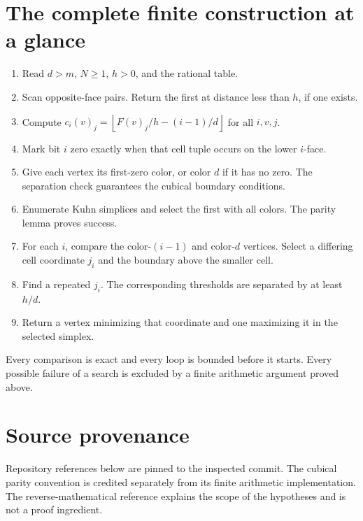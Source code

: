 \documentclass[11pt,a4paper]{article}
\theoremstyle{definition}
\newcommand{\floor}[1]{\left\lfloor #1\right\rfloor}
\begin{document}
\section{The complete finite construction at a glance}
\begin{enumerate}
\item Read $d>m$, $N\geq1$, $h>0$, and the rational table.
\item Scan opposite-face pairs. Return the first at
distance less than $h$, if one exists.
\item Compute
$c_i(v)_j=\floor{F(v)_j/h-(i-1)/d}$
for all $i,v,j$.
\item Mark bit $i$ zero exactly when that cell tuple
occurs on the lower $i$-face.
\item Give each vertex its first-zero color, or color
$d$ if it has no zero. The separation check guarantees
the cubical boundary conditions.
\item Enumerate Kuhn simplices and select the first
with all colors. The parity lemma proves success.
\item For each $i$, compare the color-$(i-1)$ and
color-$d$ vertices. Select a differing cell coordinate
$j_i$ and the boundary above the smaller cell.
\item Find a repeated $j_i$. The corresponding
thresholds are separated by at least $h/d$.
\item Return a vertex minimizing that coordinate
and one maximizing it in the selected simplex.
\end{enumerate}
Every comparison is exact and every loop is bounded
before it starts. Every possible failure of a search
is excluded by a finite arithmetic argument proved above.

\section{Source provenance}
Repository references below are pinned to the inspected
commit. The cubical parity convention is credited
separately from its finite arithmetic implementation.
The reverse-mathematical reference explains the scope
of the hypotheses and is not a proof ingredient.
\end{document}
